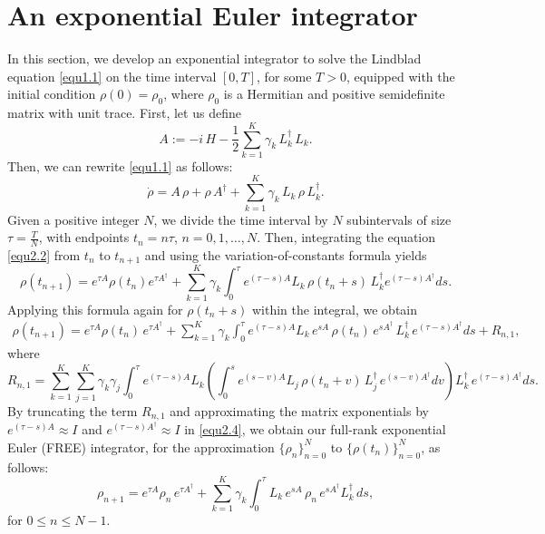 \documentclass[preprint,3p,compress,12pt]{elsarticle}
\numberwithin{equation}{section}
\numberwithin{figure}{section}
\begin{document}
\section{An exponential Euler integrator}
In this section, we develop an exponential integrator to solve the Lindblad equation \eqref{equ1.1} on the time interval $[0,T]$, for some $T>0$, equipped with the initial condition
$\rho(0)=\rho_0$, where $\rho_0$ is a Hermitian and positive semidefinite matrix with unit trace.
First, let us define
\begin{equation}\label{equ2.1}
  A:=- i \, H-\frac{1}{2}\sum_{k=1}^K\gamma_k \, L_k^{\dag} \, L_k.
\end{equation}
Then, we can rewrite \eqref{equ1.1} as follows:
\begin{equation}\label{equ2.2}
  \dot{\rho}=A \, \rho+\rho \,A^{\dag}+\sum_{k=1}^K\gamma_k \, L_k \, \rho \,L_k^{\dag}.
\end{equation}
Given a positive integer $N$, we divide the time interval by $N$
subintervals of size $\tau=\frac{T}{N}$, with endpoints
$t_n=n\tau$, $n=0,1,\ldots,N$. Then, integrating the equation \eqref{equ2.2} from $t_n$ to $t_{n+1}$ and using the variation-of-constants formula yields
\begin{equation}\label{equ2.3}
  \rho(t_{n+1})=e^{\tau A}\rho(t_n)e^{\tau A^{\dag}}+\sum_{k=1}^K\gamma_k\int_0^{\tau}e^{(\tau-s)A}L_k \, \rho(t_n+s) \, L_k^{\dag}e^{(\tau-s)A^{\dag}}ds.
\end{equation}
Applying this formula again for $\rho(t_n+s)$ within the integral, we obtain
\begin{eqnarray}\label{equ2.4}
  \rho(t_{n+1})=e^{\tau A} \rho(t_n) \, e^{\tau A^{\dag}}+\sum_{k=1}^K\gamma_k
  \int_0^{\tau}e^{(\tau-s)A}L_k \, e^{sA} \, \rho(t_n) \, e^{sA^{\dag}} \, L_k^{\dag} \, e^{(\tau-s)A^{\dag}}ds+R_{n,1},
\end{eqnarray}
where
\begin{equation}\label{equ2.4b}
  R_{n,1}=\sum_{k=1}^K\sum_{j=1}^K\gamma_k\gamma_j\int_0^{\tau}e^{(\tau-s)A}L_k
  \left(\int_0^se^{(s-v)A}L_j \, \rho(t_n+v) \, L_j^{\dag} \, e^{(s-v)A^{\dag}}dv\right)
  L_k^{\dag} \, e^{(\tau-s)A^{\dag}}ds.
\end{equation}
By truncating the term $R_{n,1}$ and approximating the matrix exponentials by $e^{(\tau-s)A}\approx I$ and $e^{(\tau-s)A^{\dag}}\approx I$ in \eqref{equ2.4}, we obtain our full-rank exponential Euler (FREE) integrator, for the approximation $\{\rho_n\}_{n=0}^N$ to $\{\rho(t_n)\}_{n=0}^N$, as follows:
\begin{equation}\label{equ2.5}
  \rho_{n+1}=e^{\tau A} \rho_n \, e^{\tau A^{\dag}}+\sum_{k=1}^K\gamma_k
  \int_0^{\tau}L_k \, e^{sA} \, \rho_n \, e^{sA^{\dag}} L_k^{\dag}\, ds ,
\end{equation}
for $0\leq n\leq N-1$.
\end{document}
